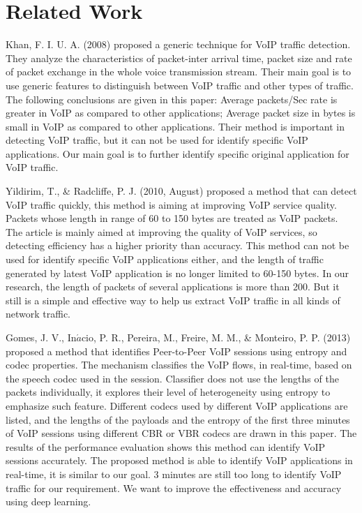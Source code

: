 \documentclass[conference]{IEEEtran}
\begin{document}
\section{Related Work}
\label{sec:relatedwork}
Khan, F. I. U. A. (2008) \cite{2} proposed a generic technique for VoIP traffic detection. They analyze the characteristics of packet-inter arrival time, packet size and rate of packet exchange in the whole voice transmission stream. Their main goal is to use generic features to distinguish between VoIP traffic and other types of traffic. The following conclusions are given in this paper: Average packets/Sec rate is greater in VoIP as compared to other applications; Average packet size in bytes is small in VoIP as compared to other applications. Their method is important in detecting VoIP traffic, but it can not be used for identify specific VoIP applications. Our main goal is to further identify specific original application for VoIP traffic.

Yildirim, T., \& Radcliffe, P. J. (2010, August) \cite{3} proposed a method that can detect VoIP traffic quickly, this method is aiming at improving VoIP service quality. Packets whose length in range of 60 to 150 bytes are treated as VoIP packets. The article is mainly aimed at improving the quality of VoIP services, so detecting efficiency has a higher priority than accuracy. This method can not be used for identify specific VoIP applications either, and the length of traffic generated by latest VoIP application is no longer limited to 60-150 bytes. In our research, the length of packets of several applications is more than 200. But it still is a simple and effective way to help us extract VoIP traffic in all kinds of network traffic.

Gomes, J. V., In$\acute{a}$cio, P. R., Pereira, M., Freire, M. M., \& Monteiro, P. P. (2013) \cite{4} proposed a method that identifies Peer-to-Peer VoIP sessions using entropy and codec properties. The mechanism classifies the VoIP flows, in real-time, based on the speech codec used in the session. Classifier does not use the lengths of the packets individually, it explores their level of heterogeneity using entropy to emphasize such feature. Different codecs used by different VoIP applications are listed, and the lengths of the payloads and the entropy of the first three minutes of VoIP sessions using different CBR or VBR codecs are drawn in this paper. The results of the performance evaluation shows this method can identify VoIP sessions accurately. The proposed method is able to identify VoIP applications in real-time, it is similar to our goal. 3 minutes are still too long to identify VoIP traffic for our requirement. We want to improve the effectiveness and accuracy using deep learning.
\end{document}
